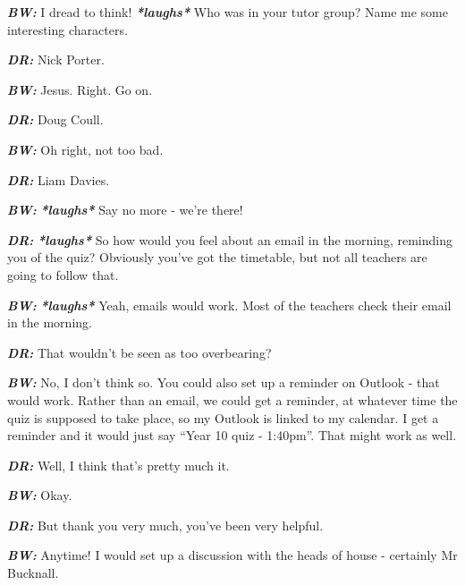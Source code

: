 \textit{\textbf{BW:}} I dread to think! \textit{\textbf{*laughs*}} Who was in your tutor group? Name me some interesting characters.

\textit{\textbf{DR:}} Nick Porter.

\textit{\textbf{BW:}} Jesus. Right. Go on.

\textit{\textbf{DR:}} Doug Coull.

\textit{\textbf{BW:}} Oh right, not too bad.

\textit{\textbf{DR:}} Liam Davies.

\textit{\textbf{BW:}} \textit{\textbf{*laughs*}} Say no more - we're there!

\textit{\textbf{DR:}} \textit{\textbf{*laughs*}} So how would you feel about an email in the morning, reminding you of the quiz? Obviously you've got the timetable, but not all teachers are going to follow that.

\textit{\textbf{BW:}} \textit{\textbf{*laughs*}} Yeah, emails would work. Most of the teachers check their email in the morning.

\textit{\textbf{DR:}} That wouldn't be seen as too overbearing?

\textit{\textbf{BW:}} No, I don't think so. You could also set up a reminder on Outlook - that would work. Rather than an email, we could get a reminder, at whatever time the quiz is supposed to take place, so my Outlook is linked to my calendar. I get a reminder and it would just say ``Year 10 quiz - 1:40pm''. That might work as well.

\textit{\textbf{DR:}} Well, I think that's pretty much it.

\textit{\textbf{BW:}} Okay.

\textit{\textbf{DR:}} But thank you very much, you've been very helpful.

\textit{\textbf{BW:}} Anytime! I would set up a discussion with the heads of house - certainly Mr Bucknall.


